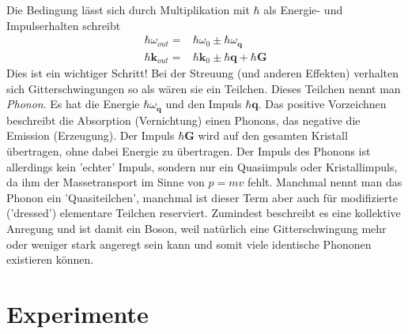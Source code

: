%

Die Bedingung lässt sich durch Multiplikation mit $\hbar$ als 
 Energie- und Impulserhalten schreibt 
\begin{align}
\hbar \omega_{out} = & \hbar \omega_{0}  \pm \hbar
 \omega_\mathbf{q} \\
\hbar \mathbf{k}_{out} =  &\hbar \mathbf{k}_{0} \pm \hbar 
\mathbf{q}  + \hbar \mathbf{G}
\end{align}
Dies ist ein wichtiger Schritt! Bei der Streuung (und anderen Effekten) verhalten sich Gitterschwingungen so als wären sie ein Teilchen. Dieses Teilchen nennt man \emph{Phonon}. Es hat die Energie $\hbar \omega_\mathbf{q}$ und den Impuls $\hbar \mathbf{q}$. Das positive Vorzeichnen beschreibt die Absorption (Vernichtung) einen Phonons, das negative die Emission (Erzeugung). Der Impuls $\hbar \mathbf{G}$ wird auf den gesamten Kristall übertragen, ohne dabei Energie zu übertragen. Der Impuls des Phonons ist allerdings kein 'echter' Impuls, sondern nur ein Quasiimpuls oder Kristallimpuls, da ihm der Massetransport im Sinne von $p = m v$ fehlt. Manchmal nennt man das Phonon ein 'Quasiteilchen', manchmal ist dieser Term aber auch für modifizierte ('dressed') elementare Teilchen reserviert. Zumindest beschreibt es eine kollektive Anregung und ist damit ein Boson, weil natürlich eine Gitterschwingung mehr oder weniger stark angeregt sein kann und somit viele identische Phononen existieren können.






\section{Experimente}


